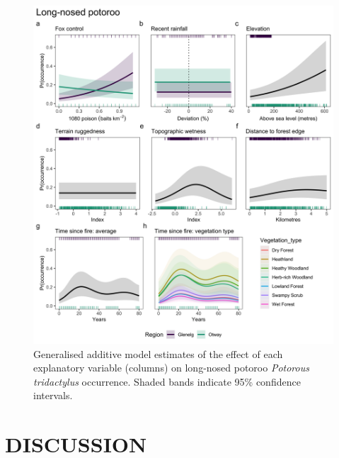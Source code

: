 \documentclass[]{elsarticle} %
\begin{document}
\begin{figure}

{\centering \includegraphics[width=0.8\linewidth]{../figs/gams_lnp} 

}

\caption{Generalised additive model estimates of the effect of each explanatory variable (columns) on long-nosed potoroo \textit{Potorous tridactylus} occurrence. Shaded bands indicate 95\% confidence intervals.}\label{fig:gams-occ-lnp}
\end{figure}

\newpage

\hypertarget{discussion}{%
\section{DISCUSSION}\label{discussion}}
\end{document}
